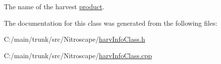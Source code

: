 The name of the harvest \hyperlink{classproduct}{product}. 

The documentation for this class was generated from the following files:\begin{DoxyCompactItemize}
\item 
C:/main/trunk/src/Nitroscape/\hyperlink{harv_info_class_8h}{harvInfoClass.h}\item 
C:/main/trunk/src/Nitroscape/\hyperlink{harv_info_class_8cpp}{harvInfoClass.cpp}\end{DoxyCompactItemize}
